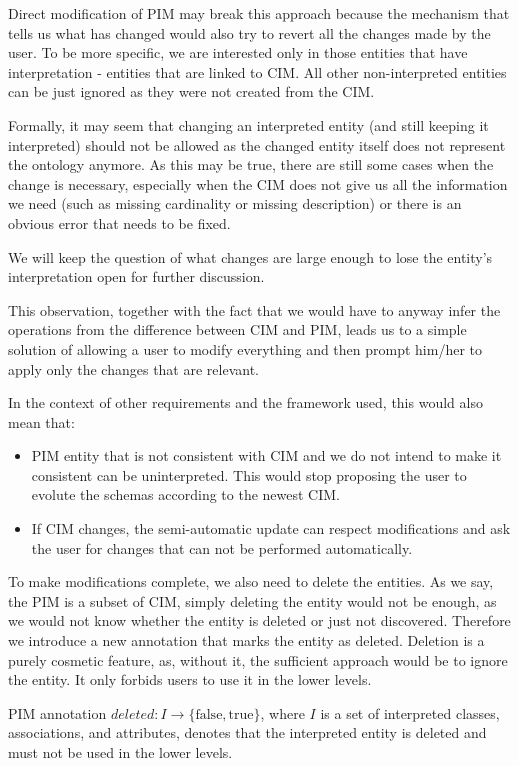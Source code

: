 Direct modification of PIM may break this approach because the mechanism that tells us what has changed would also try to revert all the changes made by the user. To be more specific, we are interested only in those entities that have interpretation - entities that are linked to CIM. All other non-interpreted entities can be just ignored as they were not created from the CIM.

Formally, it may seem that changing an interpreted entity (and still keeping it interpreted) should not be allowed as the changed entity itself does not represent the ontology anymore. As this may be true, there are still some cases when the change is necessary, especially when the CIM does not give us all the information we need (such as missing cardinality or missing description) or there is an obvious error that needs to be fixed.

We will keep the question of what changes are large enough to lose the entity's interpretation open for further discussion.

This observation, together with the fact that we would have to anyway infer the operations from the difference between CIM and PIM, leads us to a simple solution of allowing a user to modify everything and then prompt him/her to apply only the changes that are relevant.

In the context of other requirements and the framework used, this would also mean that:
\begin{itemize}
    \item PIM entity that is not consistent with CIM and we do not intend to make it consistent can be uninterpreted. This would stop proposing the user to evolute the schemas according to the newest CIM.
    \item If CIM changes, the semi-automatic update can respect modifications and ask the user for changes that can not be performed automatically.
\end{itemize}

To make modifications complete, we also need to delete the entities. As we say, the PIM is a subset of CIM, simply deleting the entity would not be enough, as we would not know whether the entity is deleted or just not discovered. Therefore we introduce a new annotation that marks the entity as deleted. Deletion is a purely cosmetic feature, as, without it, the sufficient approach would be to ignore the entity. It only forbids users to use it in the lower levels.

\begin{definition}[deleted]
    PIM annotation $deleted: I \rightarrow \{\textrm{false}, \textrm{true}\}$, where $I$ is a set of interpreted classes, associations, and attributes, denotes that the interpreted entity is deleted and must not be used in the lower levels.
\end{definition}


